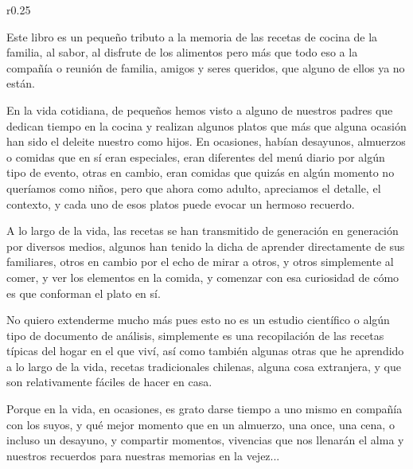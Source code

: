 \thispagestyle{empty}

\begin{wrapfigure}{r}{0.25\textwidth}
\end{wrapfigure}

Este libro es un pequeño tributo a la memoria de las recetas de cocina de la familia, al sabor, al disfrute de los alimentos pero más que todo eso a la compañía o reunión de familia, amigos y seres queridos, que alguno de ellos
ya no están. 

En la vida cotidiana, de pequeños hemos visto a alguno de nuestros padres que dedican tiempo en la cocina y realizan algunos platos que más que alguna ocasión han sido el deleite nuestro como hijos. En ocasiones, habían desayunos, almuerzos o comidas que en sí eran especiales, eran diferentes del menú diario por algún tipo de evento, otras en cambio, eran comidas que quizás en algún momento no queríamos como niños, pero que ahora como adulto, apreciamos el detalle, el contexto, y cada uno de esos platos puede evocar un hermoso recuerdo.

A lo largo de la vida, las recetas se han transmitido de generación en generación por diversos medios, algunos han tenido la dicha de aprender directamente de sus familiares, otros en cambio por el echo de mirar a otros, y otros simplemente al comer, y ver los elementos en la comida, y comenzar con esa curiosidad de cómo es que conforman el plato en sí. 

No quiero extenderme mucho más pues esto no es un estudio científico o algún tipo de documento de análisis,  simplemente es una recopilación de las recetas típicas del hogar en el que viví, así como también algunas otras que he aprendido a lo largo de la vida, recetas tradicionales chilenas, alguna cosa extranjera, y que son relativamente fáciles de hacer en casa.

Porque en la vida, en ocasiones, es grato darse tiempo a uno mismo en compañía con los suyos, y qué mejor momento que en un almuerzo, una once, una cena, o incluso un desayuno, y compartir momentos, vivencias que nos llenarán el alma y nuestros recuerdos para nuestras memorias en la vejez...
